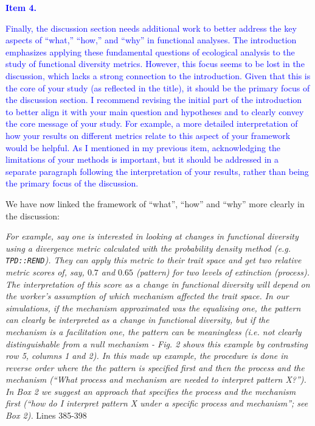 \documentclass[
]{article}
\begin{document}
\textcolor{blue}{\textbf{Item 4.}}

\textcolor{blue}{Finally, the discussion section needs additional work to better address the key aspects of ``what,'' ``how,'' and ``why'' in functional analyses.
The introduction emphasizes applying these fundamental questions of ecological analysis to the study of functional diversity metrics.
However, this focus seems to be lost in the discussion, which lacks a strong connection to the introduction.
Given that this is the core of your study (as reflected in the title), it should be the primary focus of the discussion section.
I recommend revising the initial part of the introduction to better align it with your main question and hypotheses and to clearly convey the core message of your study.
For example, a more detailed interpretation of how your results on different metrics relate to this aspect of your framework would be helpful.
As I mentioned in my previous item, acknowledging the limitations of your methods is important, but it should be addressed in a separate paragraph following the interpretation of your results, rather than being the primary focus of the discussion.}

We have now linked the framework of ``what'', ``how'' and ``why'' more clearly in the discussion:

\textit{For example, say one is interested in looking at changes in functional diversity using a divergence metric calculated with the probability density method (e.g. \texttt{TPD::REND}).
They can apply this metric to their trait space and get two relative metric scores of, say, $0.7$ and $0.65$ (pattern) for two levels of extinction (process).
The interpretation of this score as a change in functional diversity will depend on the worker's assumption of which mechanism affected the trait space.
In our simulations, if the mechanism approximated was the equalising one, the pattern can clearly be interpreted as a change in functional diversity, but if the mechanism is a facilitation one, the pattern can be meaningless (i.e. not clearly distinguishable from a null mechanism - Fig. 2 shows this example by contrasting row 5, columns 1 and 2).
In this made up example, the procedure is done in reverse order where the the pattern is specified first and then the process and the mechanism (``What process and mechanism are needed to interpret pattern X?'').
In Box 2 we suggest an approach that specifies the process and the mechanism first (``how do I interpret pattern X under a specific process and mechanism''; see Box 2).}
Lines 385-398
\end{document}

